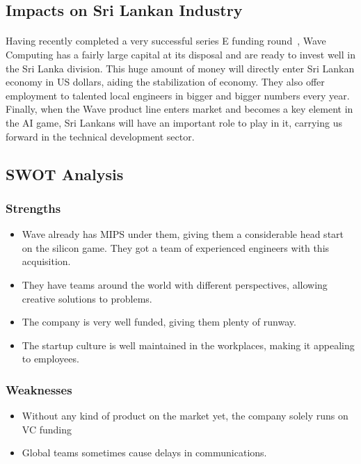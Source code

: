 \subsection{Impacts on Sri Lankan Industry}
\paragraph{}
Having recently completed a very successful series E funding round~\cite{fund}, Wave Computing has a fairly large capital at its disposal and are ready to invest well in the Sri Lanka division. This huge amount of money will directly enter Sri Lankan economy in US dollars, aiding the stabilization of economy. They also offer employment to talented local engineers in bigger and bigger numbers every year. Finally, when the Wave product line enters market and becomes a key element in the AI game, Sri Lankans will have an important role to play in it, carrying us forward in the technical development sector.

\newpage
\subsection{SWOT Analysis}

\subsubsection*{Strengths}

\begin{itemize}
    \item Wave already has MIPS under them, giving them a considerable head start on the silicon game. They got a team of experienced engineers with this acquisition.
    \item They have teams around the world with different perspectives, allowing creative solutions to problems.
    \item The company is very well funded, giving them plenty of runway.
    \item The startup culture is well maintained in the workplaces, making it appealing to employees.
\end{itemize}


\subsubsection*{Weaknesses}
\begin{itemize}
    \item Without any kind of product on the market yet, the company solely runs on VC funding
    \item Global teams sometimes cause delays in communications.
\end{itemize}


